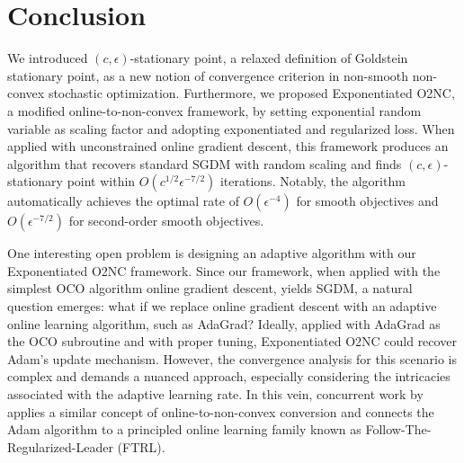 \section{Conclusion}

We introduced $(c,\epsilon)$-stationary point, a relaxed definition of Goldstein stationary point, as a new notion of convergence criterion in non-smooth non-convex stochastic optimization. Furthermore, we proposed Exponentiated O2NC, a modified online-to-non-convex framework, by setting exponential random variable as scaling factor and adopting exponentiated and regularized loss. When applied with unconstrained online gradient descent, this framework produces an algorithm that recovers standard SGDM with random scaling and finds $(c,\epsilon)$-stationary point within $O(c^{1/2}\epsilon^{-7/2})$ iterations. Notably, the algorithm automatically achieves the optimal rate of $O(\epsilon^{-4})$ for smooth objectives and $O(\epsilon^{-7/2})$ for second-order smooth objectives.



One interesting open problem is designing an adaptive algorithm with our Exponentiated O2NC framework. Since our framework, when applied with the simplest OCO algorithm online gradient descent, yields SGDM, a natural question emerges: what if we replace online gradient descent with an adaptive online learning algorithm, such as AdaGrad? Ideally, applied with AdaGrad as the OCO subroutine and with proper tuning, Exponentiated O2NC could recover Adam's update mechanism.
However, the convergence analysis for this scenario is complex and demands a nuanced approach, especially considering the intricacies associated with the adaptive learning rate.
In this vein, concurrent work by \citet{ahn2024understanding} applies a similar concept of online-to-non-convex conversion and connects the Adam algorithm to a principled online learning family known as Follow-The-Regularized-Leader (FTRL).